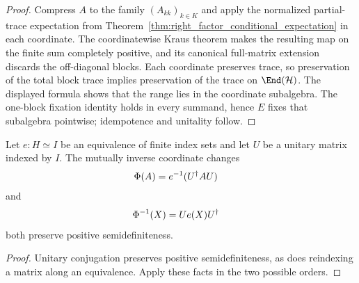 \begin{proof}\leanok
    Compress $A$ to the family $(A_{kk})_{k\in K}$ and apply the normalized
    partial-trace expectation from
    Theorem~\ref{thm:right_factor_conditional_expectation} in each coordinate.
    The coordinatewise Kraus theorem makes the resulting map on the finite
    sum completely positive, and its canonical full-matrix extension discards
    the off-diagonal blocks. Each coordinate preserves trace, so preservation
    of the total block trace implies preservation of the trace on
    $\End(\mathcal H)$. The displayed formula shows that the range lies in the
    coordinate subalgebra. The one-block fixation identity holds in every
    summand, hence $E$ fixes that subalgebra pointwise; idempotence and
    unitality follow.
\end{proof}

\begin{theorem}
    \label{thm:unitary_reindex_posSemidef}
    \leanok
    Let $e:H\simeq I$ be an equivalence of finite index sets and let
    $U$ be a unitary matrix indexed by $I$. The mutually inverse coordinate
    changes
    \begin{align}
        \Phi(A)&=e^{-1}(U^\dagger A U)
        \notag
    \end{align}
    and
    \begin{align}
        \Phi^{-1}(X)&=Ue(X)U^\dagger
        \notag
    \end{align}
    both preserve positive semidefiniteness.
\end{theorem}

\begin{proof}\leanok
    Unitary conjugation preserves positive semidefiniteness, as does
    reindexing a matrix along an equivalence. Apply these facts in the two
    possible orders.
\end{proof}

